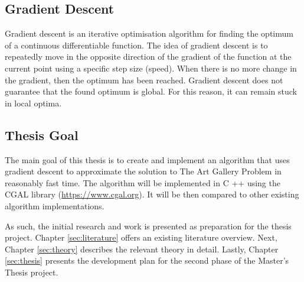 \subsection{Gradient Descent}

Gradient descent is an iterative optimisation algorithm for finding the optimum of a continuous differentiable function. The idea of gradient descent is to repeatedly move in the opposite direction of the gradient of the function at the current point using a specific step size (speed). When there is no more change in the gradient, then the optimum has been reached. Gradient descent does not guarantee that the found optimum is global. For this reason, it can remain stuck in local optima.

\subsection{Thesis Goal}

The main goal of this thesis is to create and implement an algorithm that uses gradient descent to approximate the solution to The Art Gallery Problem \cite{o1987art} in reasonably fast time. The algorithm will be implemented in C ++ using the CGAL library (\url{https://www.cgal.org}). It will be then compared to other existing algorithm implementations.

As such, the initial research and work is presented as preparation for the thesis project. Chapter \ref{sec:literature} offers an existing literature overview. Next, Chapter \ref{sec:theory} describes the relevant theory in detail.
Lastly, Chapter \ref{sec:thesis} presents the development plan for the second phase of the Master's Thesis project.